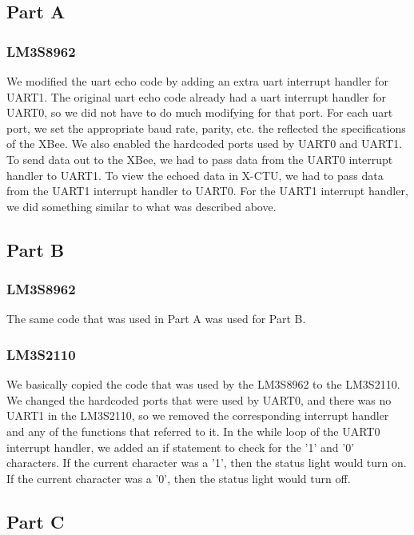 \documentclass[11pt, titlepage]{article}
\begin{document}
        \subsection{Part A}
            \subsubsection{LM3S8962}
                We modified the uart echo code by adding an extra uart interrupt handler for UART1. The original uart echo code already had a uart interrupt handler for UART0, so we did not have to do much modifying for that port. For each uart port, we set the appropriate baud rate, parity, etc. the reflected the specifications of the XBee. We also enabled the hardcoded ports used by UART0 and UART1. To send data out to the XBee, we had to pass data from the UART0 interrupt handler to UART1. To view the echoed data in X-CTU, we had to pass data from the UART1 interrupt handler to UART0. For the UART1 interrupt handler, we did something similar to what was described above.
            
        \subsection{Part B}
            \subsubsection{LM3S8962}
                The same code that was used in Part A was used for Part B.
            
            \subsubsection{LM3S2110}
                We basically copied the code that was used by the LM3S8962 to the LM3S2110. We changed the hardcoded ports that were used by UART0, and there was no UART1 in the LM3S2110, so we removed the corresponding interrupt handler and any of the functions that referred to it. In the while loop of the UART0 interrupt handler, we added an if statement to check for the '1' and '0' characters. If the current character was a '1', then the status light would turn on. If the current character was a '0', then the status light would turn off.
        
        \subsection{Part C}
\end{document}
